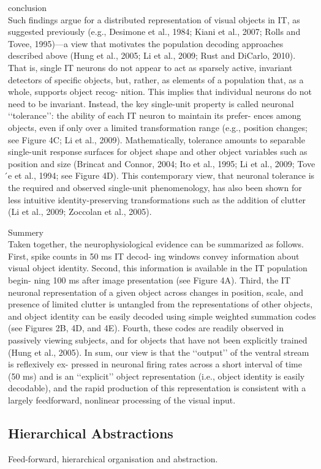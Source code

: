 conclusion\\
Such findings argue for a distributed representation of visual
objects in IT, as suggested previously (e.g., Desimone et al.,
1984; Kiani et al., 2007; Rolls and Tovee, 1995)—a view that
motivates the population decoding approaches described
above (Hung et al., 2005; Li et al., 2009; Rust and DiCarlo,
2010). That is, single IT neurons do not appear to act as sparsely
active, invariant detectors of specific objects, but, rather, as
elements of a population that, as a whole, supports object recog-
nition. This implies that individual neurons do not need to be
invariant. Instead, the key single-unit property is called neuronal
‘‘tolerance’’: the ability of each IT neuron to maintain its prefer-
ences among objects, even if only over a limited transformation
range (e.g., position changes; see Figure 4C; Li et al., 2009).
Mathematically, tolerance amounts to separable single-unit
response surfaces for object shape and other object variables
such as position and size (Brincat and Connor, 2004; Ito et al.,
1995; Li et al., 2009; Tove ́e et al., 1994; see Figure 4D). This
contemporary view, that neuronal tolerance is the required and
observed single-unit phenomenology, has also been shown for
less intuitive identity-preserving transformations such as the
addition of clutter (Li et al., 2009; Zoccolan et al., 2005).


Summery\\
Taken together, the neurophysiological evidence can be
summarized as follows. First, spike counts in 50 ms IT decod-
ing windows convey information about visual object identity.
Second, this information is available in the IT population begin-
ning 100 ms after image presentation (see Figure 4A). Third,
the IT neuronal representation of a given object across changes
in position, scale, and presence of limited clutter is untangled
from the representations of other objects, and object identity can
be easily decoded using simple weighted summation codes (see
Figures 2B, 4D, and 4E). Fourth, these codes are readily
observed in passively viewing subjects, and for objects that
have not been explicitly trained (Hung et al., 2005). In sum, our
view is that the ‘‘output’’ of the ventral stream is reflexively ex-
pressed in neuronal firing rates across a short interval of time
(50 ms) and is an ‘‘explicit’’ object representation (i.e., object
identity is easily decodable), and the rapid production of this
representation is consistent with a largely feedforward, nonlinear
processing of the visual input.
\subsection{Hierarchical Abstractions}
Feed-forward, hierarchical organisation and abstraction.



